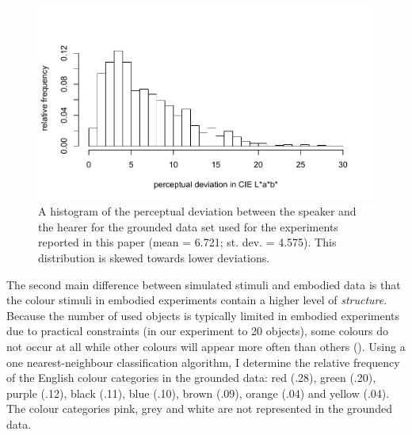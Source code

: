 \begin{figure}[htbp]
\begin{center}
\includegraphics[width=.8\textwidth]{./experiments/figures/grounding-perceptual-deviation.pdf}
\caption[Perceptual deviation between the speaker and the hearer]{A
  histogram of the perceptual deviation between the speaker and the
  hearer for the grounded data set used for the experiments reported
  in this paper (mean = 6.721; st. dev. = 4.575). This distribution is
  skewed towards lower deviations.}
\label{f:perceptual-deviation}
\end{center}
\end{figure}

The second main difference between simulated stimuli and embodied data
is that the colour stimuli in embodied experiments contain a higher
level of \emph{structure}. Because the number of used objects is
typically limited in embodied experiments due to practical constraints
(in our experiment to 20 objects), some colours do not occur at all
while other colours will appear more often than others (). Using a one nearest-neighbour
classification algorithm, I determine the relative frequency of the
English colour categories \citep{sturges95location} in the grounded
data: red (.28), green (.20), purple (.12), black (.11), blue (.10),
brown (.09), orange (.04) and yellow (.04). The colour categories
pink, grey and white are not represented in the grounded data.

